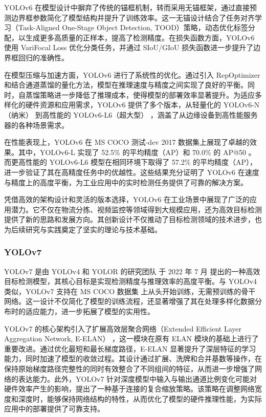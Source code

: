\documentclass[11pt,twocolumn]{ctexart}
\begin{document}
YOLOv6 在模型设计中摒弃了传统的锚框机制，转而采用无锚框架，通过直接预测边界框参数简化了模型结构并提升了训练效率。这一无锚设计结合了任务对齐学习（Task-Aligned One-Stage Object Detection, TOOD）\cite{feng2021tood}策略，动态优化标签分配，以生成更多高质量的正样本，提高了检测精度。在损失函数方面，YOLOv6 使用 VariFocal Loss 优化分类任务，并通过 SIoU/GIoU 损失函数进一步提升了边界框回归的准确性。

在模型压缩与加速方面，YOLOv6 进行了系统性的优化。通过引入 RepOptimizer 和结合通道蒸馏的量化方法，模型在推理速度与精度之间实现了良好的平衡。同时，自蒸馏策略进一步降低了推理成本，使得模型的部署效率显著提升。为适应多样化的硬件资源和应用需求，YOLOv6 提供了多个版本，从轻量化的 YOLOv6-N（纳米） 到高性能的 YOLOv6-L6（超大型） ，涵盖了从边缘设备到高性能服务器的各种场景需求。

在性能表现上，YOLOv6 在 MS COCO 测试-dev 2017 数据集上展现了卓越的效果。其中，YOLOv6-L 实现了 52.5\% 的平均精度（AP）和 70.0\% 的 AP@50 。而更高性能的 YOLOv6-L6 模型在相同环境下取得了 57.2\% 的平均精度（AP），进一步验证了其在高精度任务中的优越性。这些结果充分证明了 YOLOv6 在速度与精度上的高度平衡，为工业应用中的实时检测任务提供了可靠的解决方案。

凭借高效的架构设计和灵活的版本选择，YOLOv6 在工业场景中展现了广泛的应用潜力。它不仅在物流分拣、视频监控等领域得到大规模应用，还为高效目标检测提供了新的思路和发展方向。其创新设计不仅推动了目标检测领域的技术进步，也为后续研究与实践奠定了坚实的理论与技术基础。
\subsubsection{YOLOv7}
YOLOv7\cite{wang2023yolov7} 是由 YOLOv4 和 YOLOR 的研究团队 于 2022 年 7 月 提出的一种高效目标检测模型，其核心目标是实现检测精度与推理效率的高度平衡。与 YOLOv4 类似，YOLOv7 支持在 MS COCO 数据集 上从头开始训练，无需预训练的骨干网络。这一设计不仅简化了模型的训练流程，还显著增强了其在处理多样化数据分布时的适应能力，进一步拓展了模型的实用性。

YOLOv7 的核心架构引入了扩展高效层聚合网络（Extended Efficient Layer Aggregation Network, E-ELAN） ，这一模块在原有 ELAN 模块的基础上进行了重要改进。通过优化最短和最长梯度路径，E-ELAN 显著提升了深层特征的学习能力，同时加速了模型的收敛过程。其设计通过扩展、洗牌和合并基数等操作，在保持原始梯度路径完整性的同时有效整合了不同组间的特征，从而进一步增强了网络的表达能力。此外，YOLOv7 针对深度模型中输入与输出通道比例变化可能对硬件效率产生的影响，提出了一种基于连接的复合缩放策略。该策略在调整网络宽度和深度时，能够保持网络结构的特性，从而优化了模型的硬件推理性能，为实际应用中的部署提供了可靠支持。
\end{document}
